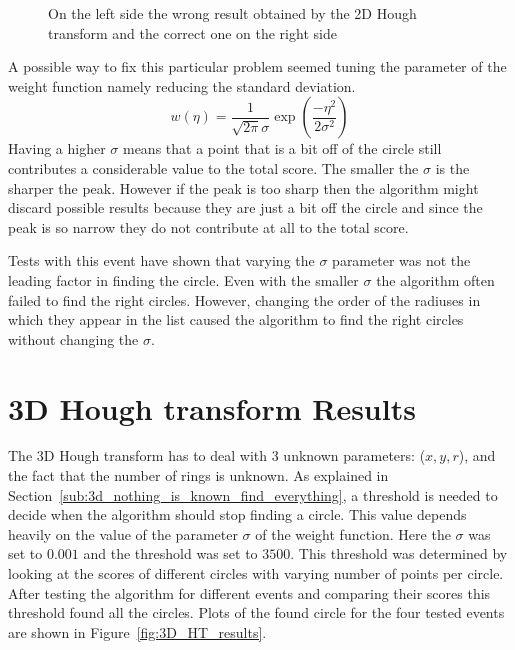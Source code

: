 \documentclass[11pt]{scrreprt}
\begin{document}
\begin{figure}
\caption{On the left side the wrong result obtained by the 2D Hough transform and the correct one on the right side}\label{fig:6c_200_bg_results}
\end{figure}

A possible way to fix this particular problem seemed tuning the parameter of the weight function namely reducing the standard deviation. 
\[
  w(\eta) = \frac{1}{\sqrt{2\pi}\sigma}\exp\left( \frac{-\eta^2}{2\sigma^2}\right)
\]
Having a higher $\sigma$ means that a point that is a bit off of the circle still contributes a considerable value to the total score. 
The smaller the $\sigma$ is the sharper the peak. However if the peak is too sharp then the algorithm might discard possible results 
because they are just a bit off the circle and since the peak is so narrow they do not contribute at all to the total score.

Tests with this event have shown that varying the $\sigma$ parameter was not the leading factor in finding the circle. Even with the smaller $\sigma$ the algorithm often failed to find the right circles. However, changing the order of the radiuses in which they appear in the list caused the algorithm to find the right circles without changing the $\sigma$.


\clearpage
\section{3D Hough transform Results} %
\label{sec:3d_hough_transform_results}
The 3D Hough transform has to deal with 3 unknown parameters: ($x,y,r$), and the fact that the number of rings is unknown. As explained in Section~\ref{sub:3d_nothing_is_known_find_everything}, a threshold is needed to decide when the algorithm
should stop finding a circle. This value depends heavily on the value of the parameter $\sigma$ of the weight function. Here the $\sigma$ was set to $0.001$ and the threshold was set to $3500$. This threshold was determined by looking at the scores of different circles with varying number of points per circle. After testing the algorithm for different events and comparing their scores this threshold found all the circles.
Plots of the found circle for the four tested events are shown in Figure~\ref{fig:3D_HT_results}.
\end{document}
